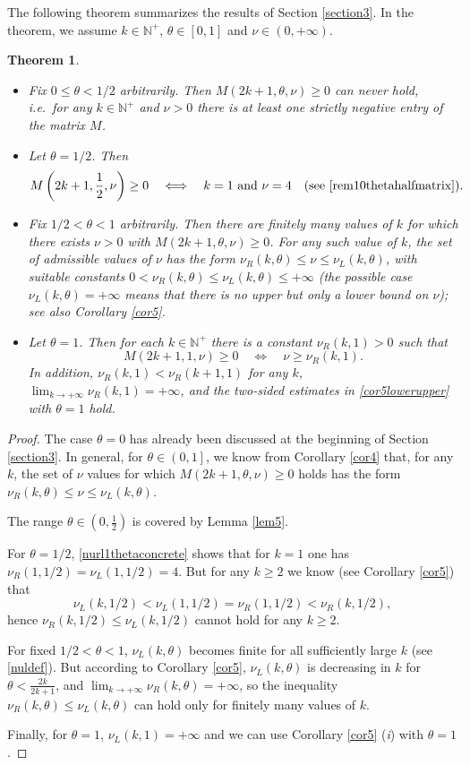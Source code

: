 \documentclass[a4paper]{article}
\newtheorem{theorem}{Theorem}
\newcommand{\te}{\theta}
\newcommand{\nul}{\nu_L(k,\theta)}
\newcommand{\nur}{\nu_R(k,\theta)}
\newcommand{\nplus}{\mathbb{N}^+}
\begin{document}
The following theorem summarizes the results of Section \ref{section3}.
In the theorem, we assume $k\in\nplus$, $\te\in[0,1]$ and $\nu\in(0,+\infty)$.
\begin{theorem}\label{thm2}
\begin{itemize}\ 
\item[$\bullet$] Fix $0\le\te<1/2$ arbitrarily. Then  $M(2k+1,\te,\nu)\ge 0$ can never hold, i.e.~for any $k\in\nplus$ and $\nu>0$ there is at least one strictly negative entry of the matrix $M$.
\item[$\bullet$] Let $\te=1/2$. Then
\[
M\left(2k+1,\frac{1}{2},\nu\right)\ge 0\quad\Longleftrightarrow\quad k=1\text{ and } \nu=4\quad\text{(see }\eqref{rem10thetahalfmatrix}\text{)}.
\]
\item[$\bullet$] Fix $1/2<\te<1$ arbitrarily. Then there are finitely many values of $k$ for which there exists $\nu>0$ with $M(2k+1,\te,\nu)\ge 0$. For any such value of $k$, the set of admissible values of $\nu$ has the form $\nur\le\nu\le\nul$, with suitable constants $0<\nur\le\nul\le+\infty$ (the possible case $\nul=+\infty$ means that there is no upper but only a lower bound on $\nu$); see also Corollary \ref{cor5}.
\item[$\bullet$] Let $\te=1$. Then for each $k\in\nplus$ there is a constant $\nu_R(k,1)>0$ such that
\[
M(2k+1,1,\nu)\ge 0\quad\Longleftrightarrow\quad \nu\ge\nu_R(k,1).
\]
In addition, $\nu_R(k,1)<\nu_R(k+1,1)$ for any $k$, $\lim_{k\to+\infty} \nu_R(k,1)=+\infty$, and the two-sided estimates in \eqref{cor5lowerupper} with $\te=1$ hold.
\end{itemize}
\end{theorem}
\begin{proof} The case $\te=0$ has already been discussed at the beginning of Section \ref{section3}.
In general, for $\te\in\left(0,1\right]$, we know from Corollary \ref{cor4} that, for any $k$, the set of $\nu$ values for which $M(2k+1,\te,\nu)\ge 0$ holds has the form $\nur\le\nu\le\nul$. 

The range $\te\in\left(0,\frac{1}{2}\right)$ is covered by Lemma \ref{lem5}. 

For $\te=1/2$, \eqref{nurl1thetaconcrete} shows that for $k=1$ one has $\nu_R(1,1/2)=\nu_L(1,1/2)=4$. 
But for any $k\ge 2$ we know (see Corollary \ref{cor5}) that
\[
\nu_L(k,1/2)<\nu_L(1,1/2)=\nu_R(1,1/2)<\nu_R(k,1/2),
\]
hence $\nu_R(k,1/2)\le\nu_L(k,1/2)$ cannot hold for any $k\ge 2$.

For fixed $1/2<\te<1$, $\nul$ becomes finite for all sufficiently large $k$ (see \eqref{nuldef}). But according to Corollary \ref{cor5}, $\nul$ is decreasing in $k$ for $\te<\frac{2k}{2k+1}$, and 
$\lim_{k\to+\infty} \nur=+\infty$, so the inequality $\nur\le\nul$ can hold only for finitely many values of $k$.

Finally, for $\te=1$, $\nu_L(k,1)=+\infty$ and we can use Corollary \ref{cor5} (\textit{i}) with $\te=1$.
\end{proof}
\end{document}
